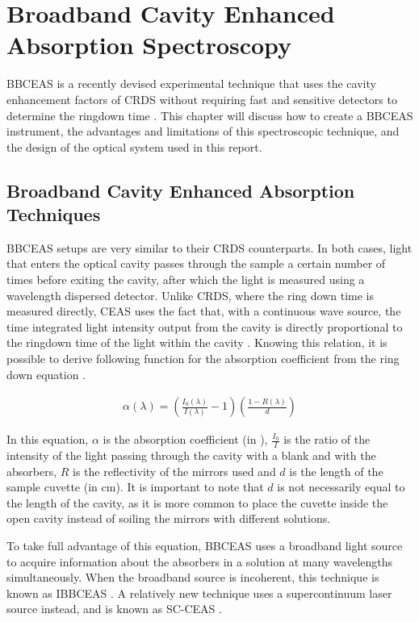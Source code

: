 \chapter{Broadband Cavity Enhanced Absorption Spectroscopy}\label{ch:bbceas}

\acf{BBCEAS} is a recently devised experimental technique that uses the cavity
enhancement factors of \ac{CRDS} without requiring fast and sensitive detectors
to determine the ringdown time \cite{Berden:2009wk}. This chapter  will discuss
how to create a \ac{BBCEAS} instrument, the advantages and limitations of this
spectroscopic technique, and the design of the optical system used in this
report.



\section{Broadband Cavity Enhanced Absorption Techniques}\label{sec:bbceas}

\acl{BBCEAS} setups are very similar to their \ac{CRDS} counterparts. In both
cases, light that enters the optical cavity passes through the sample a certain
number of times before exiting the cavity, after which the light is measured
using a wavelength dispersed detector. Unlike \ac{CRDS}, where the ring down
time is measured directly, \ac{CEAS} uses the fact that, with a continuous wave
source, the time integrated light intensity output from the cavity is directly
proportional to the ringdown time of the light within the cavity
\cite{Engeln:1998uq}.  Knowing this relation, it is possible to derive
following function for the absorption coefficient from the ring down equation \cite{Berden:2009wk}.

  \begin{align*}
    \alpha(\lambda) =
    \left(\frac{I_0(\lambda)}{I(\lambda)}-1\right)\left(\frac{1-R(\lambda)}{d}\right)
  \end{align*}

In this equation, $\alpha$ is the absorption coefficient (in \icm),
$\frac{I_0}{I}$ is the ratio of the intensity of the light passing through the
cavity with a blank and with the absorbers, $R$ is the reflectivity of the
mirrors used and $d$ is the length of the sample cuvette (in cm). It is
important to note that $d$ is not necessarily equal to the length of the
cavity, as it is more common to place the cuvette inside the open cavity
instead of soiling the mirrors with different solutions.

To take full advantage of this equation, \ac{BBCEAS} uses a broadband light
source to acquire information about the absorbers in a solution at many
wavelengths simultaneously. When the broadband source is incoherent, this
technique is known as \acf{IBBCEAS} \cite{Berden:2009wk}. A relatively new
technique uses a supercontinuum laser source instead, and is known as
\acf{SC-CEAS} \cite{Kiwanuka:2010bj}.



